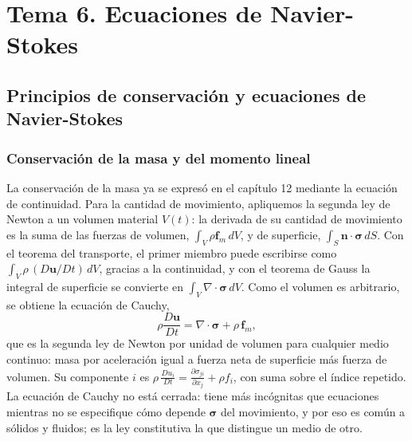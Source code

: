 \documentclass[10pt,openany]{book}
\begin{document}
\part{Tema 6. Ecuaciones de Navier-Stokes}

\chapter{Principios de conservación y ecuaciones de Navier-Stokes}
\label{chap:c14}


\section{Conservación de la masa y del momento lineal}

La conservación de la masa ya se expresó en el capítulo 12 mediante la ecuación de continuidad. Para la cantidad de movimiento, apliquemos la segunda ley de Newton a un volumen material \(V(t)\): la derivada de su cantidad de movimiento es la suma de las fuerzas de volumen, \(\int_V\rho\mathbf{f}_m\,dV\), y de superficie, \(\int_S\mathbf{n}\cdot\boldsymbol{\sigma}\,dS\). Con el teorema del transporte, el primer miembro puede escribirse como \(\int_V\rho\,(D\mathbf{u}/Dt)\,dV\), gracias a la continuidad, y con el teorema de Gauss la integral de superficie se convierte en \(\int_V\nabla\cdot\boldsymbol{\sigma}\,dV\). Como el volumen es arbitrario, se obtiene la ecuación de Cauchy,
\begin{equation}
\rho\frac{D\mathbf{u}}{Dt} = \nabla\cdot\boldsymbol{\sigma} + \rho\,\mathbf{f}_m, \label{eq:c14-cauchy}
\end{equation}
que es la segunda ley de Newton por unidad de volumen para cualquier medio continuo: masa por aceleración igual a fuerza neta de superficie más fuerza de volumen. Su componente \(i\) es \(\rho\,\frac{Du_i}{Dt} = \frac{\partial\sigma_{ji}}{\partial x_j} + \rho f_i\), con suma sobre el índice repetido. La ecuación de Cauchy no está cerrada: tiene más incógnitas que ecuaciones mientras no se especifique cómo depende \(\boldsymbol{\sigma}\) del movimiento, y por eso es común a sólidos y fluidos; es la ley constitutiva la que distingue un medio de otro.
\end{document}
